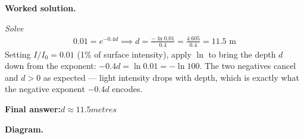 \documentclass[11pt]{article}
\begin{document}
\textbf{Worked solution.}

\textit{Solve}
\[\begin{gathered}
0.01 = e^{-0.4d} \implies d = \frac{-\ln 0.01}{0.4} = \frac{4.605}{0.4} = 11.5 \text{ m}
\end{gathered}\]
Setting \( I/I_0 = 0.01 \) (1\% of surface intensity), apply \( \ln \) to bring the depth \( d \) down from the exponent: \( -0.4d = \ln 0.01 = -\ln 100 \). The two negatives cancel and \( d > 0 \) as expected --- light intensity drops with depth, which is exactly what the negative exponent \( -0.4d \) encodes.

\begin{answerbox}
\textbf{Final answer:}\quad \(\displaystyle d \approx 11.5 metres\)
\end{answerbox}
\textbf{Diagram.}
\end{document}
